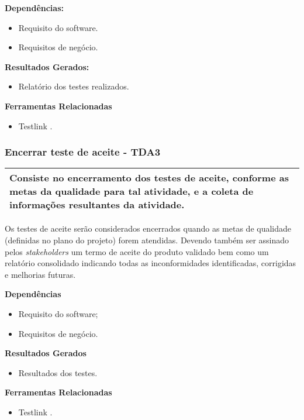 \textbf{Dependências: }
\begin{itemize}
    \item Requisito do software.
    \item Requisitos de negócio.
\end{itemize}

\textbf{Resultados Gerados: }
\begin{itemize}
    \item Relatório dos testes realizados.  
\end{itemize}

\textbf{Ferramentas Relacionadas }
\begin{itemize}
    \item Testlink \cite{TestLink}. 
\end{itemize}

\subsubsection{Encerrar teste de aceite - TDA3}
\label{sec:tda3}

\begin{table}[H]
\centering
\begin{tabular}{|p{130mm}|}
\hline
Consiste no encerramento dos testes de aceite, conforme as metas da qualidade para tal atividade, e a coleta de informações resultantes da atividade. \\ 
\hline
\end{tabular}
\end{table}

Os testes de aceite serão considerados encerrados quando as metas de qualidade (definidas no plano do projeto) forem atendidas. Devendo também ser assinado pelos \textit{stakeholders} um termo de aceite do produto validado bem como um relatório consolidado indicando todas as inconformidades identificadas, corrigidas e melhorias futuras.

\textbf{Dependências}
\begin{itemize}
    \item Requisito do software;
    \item Requisitos de negócio.
\end{itemize}

\textbf{Resultados Gerados}
\begin{itemize}
    \item Resultados dos testes.
\end{itemize}

\textbf{Ferramentas Relacionadas}
\begin{itemize}
    \item Testlink \cite{TestLink}.
\end{itemize}


